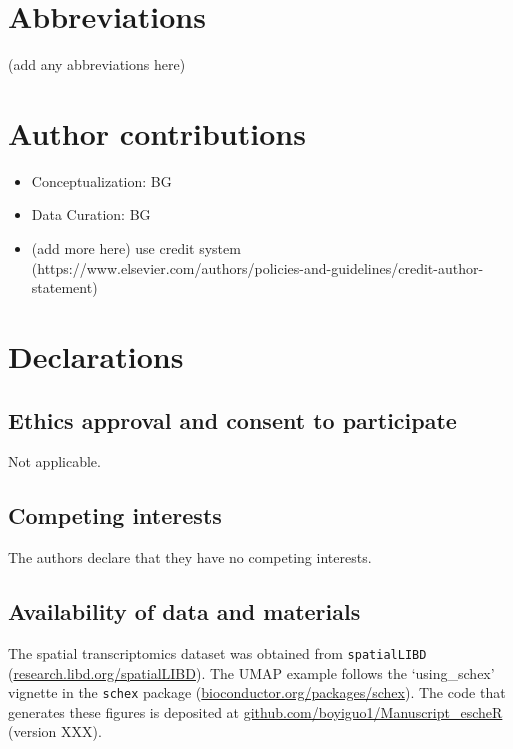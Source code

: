 \documentclass[10pt,twocolumn]{article}
\newcommand{\fixme}[1]{{\color{red} (#1)}}
\begin{document}




\section*{Abbreviations}

\fixme{add any abbreviations here}

\section*{Author contributions}

\begin{itemize}[nosep]
    \item Conceptualization: BG
    \item Data Curation: BG
    \item \fixme{add more here} use credit system (https://www.elsevier.com/authors/policies-and-guidelines/credit-author-statement)
\end{itemize}

\section*{Declarations}

\subsection*{Ethics approval and consent to participate}
Not applicable.

\subsection*{Competing interests}
The authors declare that they have no competing interests.

\subsection*{Availability of data and materials}
The spatial transcriptomics dataset was obtained from \texttt{spatialLIBD} (\href{http://research.libd.org/spatialLIBD}{research.libd.org/spatialLIBD}). The UMAP example follows the `using\_schex' vignette in the \texttt{schex} package (\href{https://www.bioconductor.org/packages/schex}{bioconductor.org/packages/schex}). The code that generates these figures is deposited at \href{https://github.com/boyiguo1/Manuscript_escheR}{github.com/boyiguo1/Manuscript\_escheR} \fixme{version XXX}.
\end{document}
